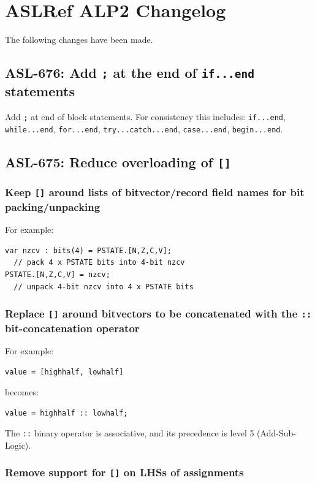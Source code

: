 \chapter{ASLRef ALP2 Changelog}

The following changes have been made.

\section{ASL-676: Add \texttt{;} at the end of \texttt{if...end} statements}

Add \texttt{;} at end of block statements.
For consistency this includes: \texttt{if...end}, \texttt{while...end},
\texttt{for...end}, \texttt{try...catch...end}, \texttt{case...end},
\texttt{begin...end}.

\section{ASL-675: Reduce overloading of \texttt{[]}}

\subsection{Keep \texttt{[]} around lists of bitvector/record field
names for bit packing/unpacking}

For example:
\begin{verbatim}
var nzcv : bits(4) = PSTATE.[N,Z,C,V];
  // pack 4 x PSTATE bits into 4-bit nzcv
PSTATE.[N,Z,C,V] = nzcv;
  // unpack 4-bit nzcv into 4 x PSTATE bits
\end{verbatim}

\subsection{Replace \texttt{[]} around bitvectors to be concatenated
with the \texttt{::} bit-concatenation operator}

For example:
\begin{verbatim}
value = [highhalf, lowhalf]
\end{verbatim}
becomes:
\begin{verbatim}
value = highhalf :: lowhalf;
\end{verbatim}
The \texttt{::} binary operator is associative, and its precedence is
level 5 (Add-Sub-Logic).

\subsection{Remove support for \texttt{[]} on LHSs of assignments}

